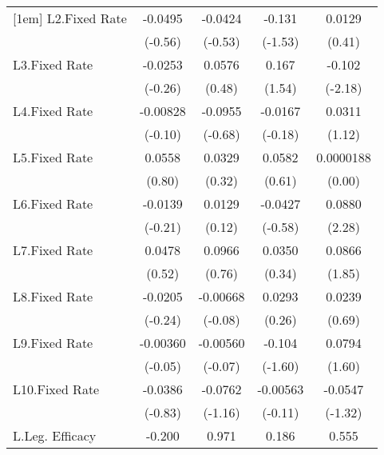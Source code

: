 {\begin{longtable}{l*{4}{c}}
[1em]
L2.Fixed Rate   &  -0.0495         &  -0.0424         &   -0.131         &   0.0129         \\
                &  (-0.56)         &  (-0.53)         &  (-1.53)         &   (0.41)         \\
[1em]
L3.Fixed Rate   &  -0.0253         &   0.0576         &    0.167         &   -0.102\sym{*}  \\
                &  (-0.26)         &   (0.48)         &   (1.54)         &  (-2.18)         \\
[1em]
L4.Fixed Rate   & -0.00828         &  -0.0955         &  -0.0167         &   0.0311         \\
                &  (-0.10)         &  (-0.68)         &  (-0.18)         &   (1.12)         \\
[1em]
L5.Fixed Rate   &   0.0558         &   0.0329         &   0.0582         &0.0000188         \\
                &   (0.80)         &   (0.32)         &   (0.61)         &   (0.00)         \\
[1em]
L6.Fixed Rate   &  -0.0139         &   0.0129         &  -0.0427         &   0.0880\sym{*}  \\
                &  (-0.21)         &   (0.12)         &  (-0.58)         &   (2.28)         \\
[1em]
L7.Fixed Rate   &   0.0478         &   0.0966         &   0.0350         &   0.0866         \\
                &   (0.52)         &   (0.76)         &   (0.34)         &   (1.85)         \\
[1em]
L8.Fixed Rate   &  -0.0205         & -0.00668         &   0.0293         &   0.0239         \\
                &  (-0.24)         &  (-0.08)         &   (0.26)         &   (0.69)         \\
[1em]
L9.Fixed Rate   & -0.00360         & -0.00560         &   -0.104         &   0.0794         \\
                &  (-0.05)         &  (-0.07)         &  (-1.60)         &   (1.60)         \\
[1em]
L10.Fixed Rate  &  -0.0386         &  -0.0762         & -0.00563         &  -0.0547         \\
                &  (-0.83)         &  (-1.16)         &  (-0.11)         &  (-1.32)         \\
[1em]
L.Leg. Efficacy &   -0.200         &    0.971         &    0.186         &    0.555         \\

\end{longtable}}
